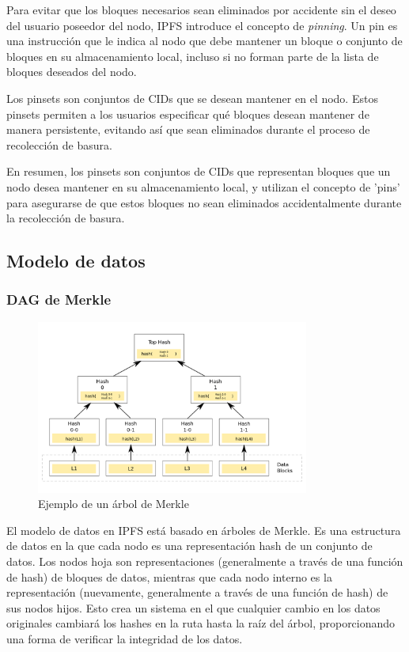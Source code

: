Para evitar que los bloques necesarios sean eliminados por accidente sin el deseo del usuario poseedor del nodo, IPFS introduce el concepto de \textit{pinning}. Un pin es una
instrucción que le indica al nodo que debe mantener un bloque o conjunto de bloques en su almacenamiento local, incluso si no forman parte de la lista de bloques deseados del nodo.

Los pinsets son conjuntos de CIDs que se desean mantener en el nodo. Estos pinsets permiten a los usuarios
especificar qué bloques desean mantener de manera persistente, evitando así que sean eliminados durante el proceso de
recolección de basura.

En resumen, los pinsets son conjuntos de CIDs que representan bloques que un nodo desea mantener en su almacenamiento local, y utilizan el concepto de 'pins' para asegurarse de que estos bloques no sean eliminados accidentalmente durante la recolección de basura.

\subsection{Modelo de datos}\label{sect:modelo-de-datos}
\subsubsection{DAG de Merkle}
\begin{figure}[H]
      \centering
      \includegraphics[width=0.8\textwidth]{images/merkledag.png}
      \caption{Ejemplo de un árbol de Merkle}
      \label{merkledag}
\end{figure}
El modelo de datos en IPFS está basado en árboles de Merkle. Es una estructura de datos en la que cada nodo es una representación hash de un conjunto de datos.
Los nodos hoja son representaciones (generalmente a través de una función de hash) de bloques de datos, mientras que cada nodo interno es la representación
(nuevamente, generalmente a través de una función de hash) de sus nodos hijos. Esto crea un sistema en el que cualquier cambio en los datos originales cambiará
los hashes en la ruta hasta la raíz del árbol, proporcionando una forma de verificar la integridad de los datos.

